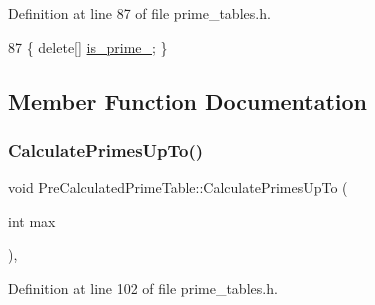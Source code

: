 Definition at line 87 of file prime\+\_\+tables.\+h.


\begin{DoxyCode}
87 \{ \textcolor{keyword}{delete}[] \hyperlink{classPreCalculatedPrimeTable_ac393ebf41a32b3cba39fe67f7aa5fa38}{is\_prime\_}; \}
\end{DoxyCode}


\subsection{Member Function Documentation}
\mbox{\label{classPreCalculatedPrimeTable_a393cb4947a57da9442e435eeff168b76}} 
\subsubsection{\texorpdfstring{Calculate\+Primes\+Up\+To()}{CalculatePrimesUpTo()}}
{\footnotesize\ttfamily void Pre\+Calculated\+Prime\+Table\+::\+Calculate\+Primes\+Up\+To (\begin{DoxyParamCaption}\item[{int}]{max }\end{DoxyParamCaption})\hspace{0.3cm}{\ttfamily [inline]}, {\ttfamily [private]}}



Definition at line 102 of file prime\+\_\+tables.\+h.


